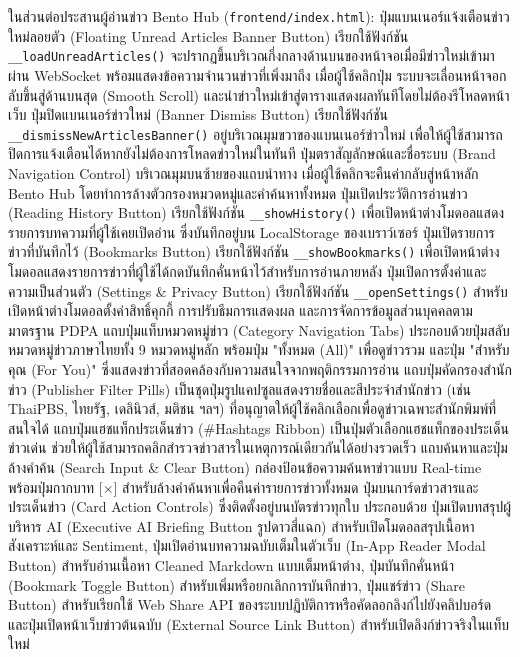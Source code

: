 ในส่วนต่อประสานผู้อ่านข่าว Bento Hub (\texttt{frontend/index.html}):
ปุ่มแบนเนอร์แจ้งเตือนข่าวใหม่ลอยตัว (Floating Unread Articles Banner Button) เรียกใช้ฟังก์ชัน \texttt{\_\_loadUnreadArticles()} จะปรากฏขึ้นบริเวณกึ่งกลางด้านบนของหน้าจอเมื่อมีข่าวใหม่เข้ามาผ่าน WebSocket พร้อมแสดงข้อความจำนวนข่าวที่เพิ่งมาถึง เมื่อผู้ใช้คลิกปุ่ม ระบบจะเลื่อนหน้าจอกลับขึ้นสู่ด้านบนสุด (Smooth Scroll) และนำข่าวใหม่เข้าสู่ตารางแสดงผลทันทีโดยไม่ต้องรีโหลดหน้าเว็บ
ปุ่มปิดแบนเนอร์ข่าวใหม่ (Banner Dismiss Button) เรียกใช้ฟังก์ชัน \texttt{\_\_dismissNewArticlesBanner()} อยู่บริเวณมุมขวาของแบนเนอร์ข่าวใหม่ เพื่อให้ผู้ใช้สามารถปิดการแจ้งเตือนได้หากยังไม่ต้องการโหลดข่าวใหม่ในทันที
ปุ่มตราสัญลักษณ์และชื่อระบบ (Brand Navigation Control) บริเวณมุมบนซ้ายของแถบนำทาง เมื่อผู้ใช้คลิกจะคืนค่ากลับสู่หน้าหลัก Bento Hub โดยทำการล้างตัวกรองหมวดหมู่และคำค้นหาทั้งหมด
ปุ่มเปิดประวัติการอ่านข่าว (Reading History Button) เรียกใช้ฟังก์ชัน \texttt{\_\_showHistory()} เพื่อเปิดหน้าต่างโมดอลแสดงรายการบทความที่ผู้ใช้เคยเปิดอ่าน ซึ่งบันทึกอยู่บน LocalStorage ของเบราว์เซอร์
ปุ่มเปิดรายการข่าวที่บันทึกไว้ (Bookmarks Button) เรียกใช้ฟังก์ชัน \texttt{\_\_showBookmarks()} เพื่อเปิดหน้าต่างโมดอลแสดงรายการข่าวที่ผู้ใช้ได้กดบันทึกคั่นหน้าไว้สำหรับการอ่านภายหลัง
ปุ่มเปิดการตั้งค่าและความเป็นส่วนตัว (Settings \& Privacy Button) เรียกใช้ฟังก์ชัน \texttt{\_\_openSettings()} สำหรับเปิดหน้าต่างโมดอลตั้งค่าสิทธิ์คุกกี้ การปรับธีมการแสดงผล และการจัดการข้อมูลส่วนบุคคลตามมาตรฐาน PDPA
แถบปุ่มแท็บหมวดหมู่ข่าว (Category Navigation Tabs) ประกอบด้วยปุ่มสลับหมวดหมู่ข่าวภาษาไทยทั้ง 9 หมวดหมู่หลัก พร้อมปุ่ม "ทั้งหมด (All)" เพื่อดูข่าวรวม และปุ่ม "สำหรับคุณ (For You)" ซึ่งแสดงข่าวที่สอดคล้องกับความสนใจจากพฤติกรรมการอ่าน
แถบปุ่มคัดกรองสำนักข่าว (Publisher Filter Pills) เป็นชุดปุ่มรูปแคปซูลแสดงรายชื่อและสีประจำสำนักข่าว (เช่น ThaiPBS, ไทยรัฐ, เดลินิวส์, มติชน ฯลฯ) ที่อนุญาตให้ผู้ใช้คลิกเลือกเพื่อดูข่าวเฉพาะสำนักพิมพ์ที่สนใจได้
แถบปุ่มแฮชแท็กประเด็นข่าว (\#Hashtags Ribbon) เป็นปุ่มตัวเลือกแฮชแท็กของประเด็นข่าวเด่น ช่วยให้ผู้ใช้สามารถคลิกสำรวจข่าวสารในเหตุการณ์เดียวกันได้อย่างรวดเร็ว
แถบค้นหาและปุ่มล้างคำค้น (Search Input \& Clear Button) กล่องป้อนข้อความค้นหาข่าวแบบ Real-time พร้อมปุ่มกากบาท [$\times$] สำหรับล้างคำค้นหาเพื่อคืนค่ารายการข่าวทั้งหมด
ปุ่มบนการ์ดข่าวสารและประเด็นข่าว (Card Action Controls) ซึ่งติดตั้งอยู่บนบัตรข่าวทุกใบ ประกอบด้วย ปุ่มเปิดบทสรุปผู้บริหาร AI (Executive AI Briefing Button รูปดาวสี่แฉก) สำหรับเปิดโมดอลสรุปเนื้อหาสังเคราะห์และ Sentiment, ปุ่มเปิดอ่านบทความฉบับเต็มในตัวเว็บ (In-App Reader Modal Button) สำหรับอ่านเนื้อหา Cleaned Markdown แบบเต็มหน้าต่าง, ปุ่มบันทึกคั่นหน้า (Bookmark Toggle Button) สำหรับเพิ่มหรือยกเลิกการบันทึกข่าว, ปุ่มแชร์ข่าว (Share Button) สำหรับเรียกใช้ Web Share API ของระบบปฏิบัติการหรือคัดลอกลิงก์ไปยังคลิปบอร์ด และปุ่มเปิดหน้าเว็บข่าวต้นฉบับ (External Source Link Button) สำหรับเปิดลิงก์ข่าวจริงในแท็บใหม่
